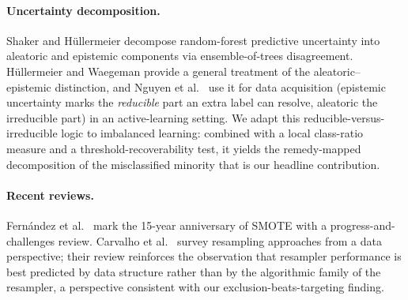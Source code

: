 \paragraph{Uncertainty decomposition.}
Shaker and H\"ullermeier \cite{shaker2020aleatoric} decompose random-forest
predictive uncertainty into aleatoric and epistemic components via
ensemble-of-trees disagreement. H\"ullermeier and Waegeman
\cite{hullermeier2021aleatoric} provide a general treatment of the
aleatoric--epistemic distinction, and Nguyen et al.\
\cite{nguyen2019epistemic} use it for data acquisition (epistemic uncertainty
marks the \emph{reducible} part an extra label can resolve, aleatoric the
irreducible part) in an active-learning setting. We adapt this
reducible-versus-irreducible logic to imbalanced learning: combined with a local
class-ratio measure and a threshold-recoverability test, it yields the
remedy-mapped decomposition of the misclassified minority that is our headline
contribution.

\paragraph{Recent reviews.}
Fern\'andez et al.\ \cite{fernandez2018smote} mark the 15-year anniversary
of SMOTE with a progress-and-challenges review. Carvalho et al.\
\cite{carvalho2025resampling} survey resampling approaches from a data
perspective; their review reinforces the observation that resampler
performance is best predicted by data structure rather than by the
algorithmic family of the resampler, a perspective consistent with our
exclusion-beats-targeting finding.
